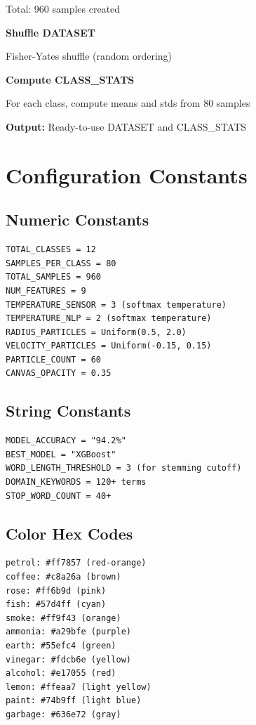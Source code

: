 \documentclass[12pt,a4paper]{article}
\begin{document}
Total: 960 samples created

\textbf{Shuffle DATASET}

Fisher-Yates shuffle (random ordering)

\textbf{Compute CLASS\_STATS}

For each class, compute means and stds from 80 samples

\textbf{Output:} Ready-to-use DATASET and CLASS\_STATS

\section{Configuration Constants}

\subsection{Numeric Constants}

\begin{verbatim}
TOTAL_CLASSES = 12
SAMPLES_PER_CLASS = 80
TOTAL_SAMPLES = 960
NUM_FEATURES = 9
TEMPERATURE_SENSOR = 3 (softmax temperature)
TEMPERATURE_NLP = 2 (softmax temperature)
RADIUS_PARTICLES = Uniform(0.5, 2.0)
VELOCITY_PARTICLES = Uniform(-0.15, 0.15)
PARTICLE_COUNT = 60
CANVAS_OPACITY = 0.35
\end{verbatim}

\subsection{String Constants}

\begin{verbatim}
MODEL_ACCURACY = "94.2%"
BEST_MODEL = "XGBoost"
WORD_LENGTH_THRESHOLD = 3 (for stemming cutoff)
DOMAIN_KEYWORDS = 120+ terms
STOP_WORD_COUNT = 40+
\end{verbatim}

\subsection{Color Hex Codes}

\begin{verbatim}
petrol: #ff7857 (red-orange)
coffee: #c8a26a (brown)
rose: #ff6b9d (pink)
fish: #57d4ff (cyan)
smoke: #ff9f43 (orange)
ammonia: #a29bfe (purple)
earth: #55efc4 (green)
vinegar: #fdcb6e (yellow)
alcohol: #e17055 (red)
lemon: #ffeaa7 (light yellow)
paint: #74b9ff (light blue)
garbage: #636e72 (gray)
\end{verbatim}
\end{document}
